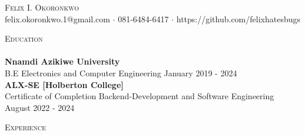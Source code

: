 \documentclass[a4paper]{article}
\newcommand{\lineunder} {
    \vspace*{-8pt} \\
    \hspace*{-18pt} \hrulefill \\
}
\newcommand{\header} [1] {
    {\hspace*{-18pt}\vspace*{6pt} \textsc{#1}}
    \vspace*{-6pt} \lineunder
}
\begin{document}
\vspace*{-40pt}

    

\vspace*{-10pt}
\begin{center}
	{\Huge \scshape {Felix I. Okoronkwo}}\\
	felix.okoronkwo.1@gmail.com $\cdot$ 081-6484-6417 $\cdot$ https://github.com/felixhatesbugs\\
\end{center}

\header{Education}
\textbf{Nnamdi Azikiwe University}\\
B.E Electronics and Computer Engineering \hfill January 2019 - 2024\\
\vspace{2mm}
\textbf{ALX-SE [Holberton College]}\\
Certificate of Completion Backend-Development and Software Engineering \hfill August 2022 - 2024\\
\vspace{2mm}

\header{Experience}
\vspace{1mm}
\end{document}
